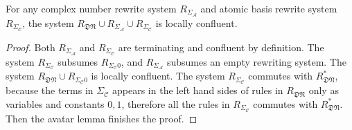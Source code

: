 \documentclass[manuscript, review, timestamp]{acmart}
\newcommand*{\fst}{\texttt{fst }}
\newcommand*{\snd}{\texttt{snd }}
\newcommand*{\reduce}{\ \triangleright\ }
\begin{document}
\begin{lemma}
  For any complex number rewrite system $R_{\Sigma_\mathcal{A}}$ and atomic basis rewrite system $R_{\Sigma_\mathcal{C}}$, the system $R_\mathfrak{DN} \cup R_{\Sigma_\mathcal{A}} \cup R_{\Sigma_\mathcal{C}}$ is locally confluent.
\end{lemma}
\begin{proof}
  Both $R_{\Sigma_\mathcal{A}}$ and $R_{\Sigma_\mathcal{C}}$ are terminating and confluent by definition. 
  The system $R_{\Sigma_\mathcal{C}}$ subsumes $R_{\Sigma_\mathcal{C}0}$, and $R_{\Sigma_\mathcal{A}}$ subsumes an empty rewriting system. 
  The system $R_\mathfrak{DN} \cup R_{\Sigma_\mathcal{C}0}$ is locally confluent. 
  The system $R_{\Sigma_\mathcal{C}}$ commutes with $R_\mathfrak{DN}^*$, because the terms in $\Sigma_\mathcal{C}$ appears in the left hand sides of rules in $R_\mathfrak{DN}$ only as variables and constants $0, 1$, therefore all the rules in $R_{\Sigma_\mathcal{C}}$ commutes with $R_\mathfrak{DN}^*$. 
  Then the avatar lemma finishes the proof.
\end{proof}







\end{document}

